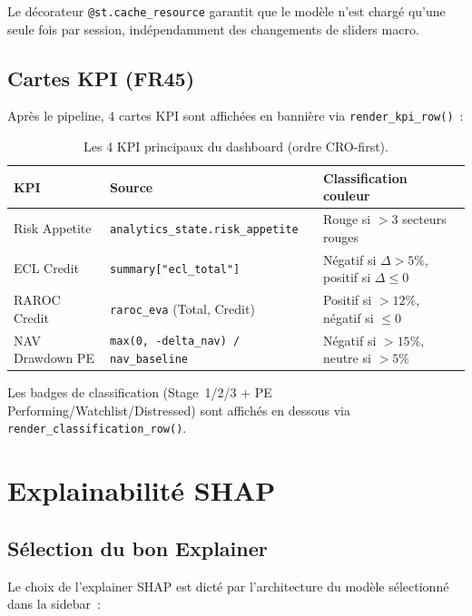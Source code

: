 \documentclass[12pt,a4paper]{article}
\begin{document}
Le d\'ecorateur \texttt{@st.cache\_resource} garantit que le mod\`ele n'est charg\'e qu'une seule fois par session, ind\'ependamment des changements de sliders macro.

\subsection{Cartes KPI (FR45)}

Apr\`es le pipeline, 4 cartes KPI sont affich\'ees en banni\`ere via \texttt{render\_kpi\_row()}~:

\begin{table}[ht]
\centering
\caption{Les 4 KPI principaux du dashboard (ordre CRO-first).}
\label{tab:kpi}
\small
\begin{tabular}{@{}llp{6cm}@{}}
\toprule
\textbf{KPI} & \textbf{Source} & \textbf{Classification couleur} \\
\midrule
Risk Appetite & \texttt{analytics\_state.risk\_appetite} & Rouge si $> 3$ secteurs rouges \\
ECL Credit & \texttt{summary["ecl\_total"]} & \textcolor{accentred}{N\'egatif} si $\Delta > 5\%$, \textcolor{accentgreen}{positif} si $\Delta \leq 0$ \\
RAROC Credit & \texttt{raroc\_eva} (Total, Credit) & \textcolor{accentgreen}{Positif} si $> 12\%$, \textcolor{accentred}{n\'egatif} si $\leq 0$ \\
NAV Drawdown PE & \texttt{max(0, -delta\_nav) / nav\_baseline} & \textcolor{accentred}{N\'egatif} si $> 15\%$, neutre si $> 5\%$ \\
\bottomrule
\end{tabular}
\end{table}

Les badges de classification (Stage~1/2/3 + PE Performing/Watchlist/Distressed) sont affich\'es en dessous via \texttt{render\_classification\_row()}.


\section{Explainabilit\'e SHAP}
\label{sec:shap}

\subsection{S\'election du bon Explainer}

Le choix de l'explainer SHAP est dict\'e par l'architecture du mod\`ele s\'electionn\'e dans la sidebar~:
\end{document}
